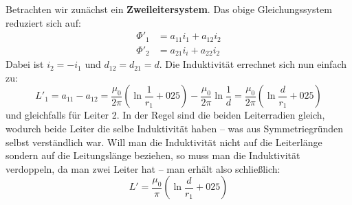 Betrachten wir zunächst ein \textbf{Zweileitersystem}. Das obige Gleichungssystem reduziert sich auf:
\begin{align}
\Phi'_1 &= a_{11}i_1 + a_{12}i_2 \\
\Phi'_2 &= a_{21}i_i + a_{22}i_2
\end{align}
Dabei ist $i_2 = -i_1$ und $d_{12} = d_{21} = d$. Die Induktivität errechnet sich nun einfach zu:
\begin{equation}
L'_1 = a_{11} - a_{12} = \frac{\mu_0}{2\pi}\left(\ln\frac{1}{r_1}+025\right)-\frac{\mu_0}{2\pi}\ln\frac{1}{d} = 
\frac{\mu_0}{2\pi}\left(\ln\frac{d}{r_1}+025\right)
\end{equation}
und gleichfalls für Leiter 2. In der Regel sind die beiden Leiterradien gleich, wodurch beide Leiter die selbe Induktivität haben – was aus Symmetriegründen selbst verständlich war. Will man die Induktivität nicht auf die Leiterlänge sondern auf die Leitungslänge beziehen, so muss man die Induktivität verdoppeln, da man zwei Leiter hat – man erhält also schließlich:
\begin{equation}
L' = \frac{\mu_0}{\pi}\left(\ln\frac{d}{r_1}+025\right)
\end{equation}

